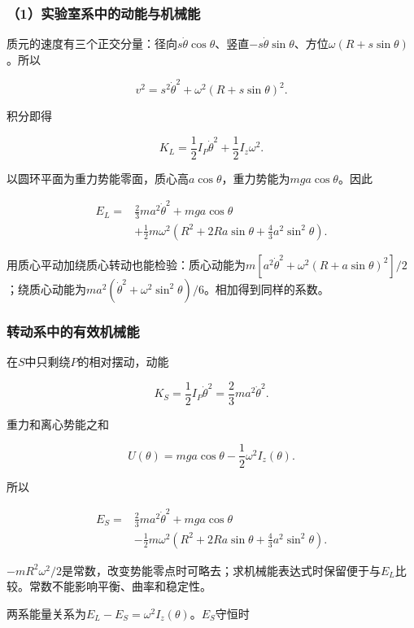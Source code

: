 \documentclass[12pt,a4paper,fontset=fandol]{ctexart}
\begin{document}
\subsubsection{（1）实验室系中的动能与机械能}\label{ux5b9eux9a8cux5ba4ux7cfbux4e2dux7684ux52a8ux80fdux4e0eux673aux68b0ux80fd}

质元的速度有三个正交分量：径向\(s\dot\theta\cos\theta\)、竖直\(-s\dot\theta\sin\theta\)、方位\(\omega(R+s\sin\theta)\)。所以

\[
v^2=s^2\dot\theta^2+\omega^2(R+s\sin\theta)^2.
\]

积分即得

\[
K_L=\frac12I_P\dot\theta^2+\frac12I_z\omega^2.
\]

以圆环平面为重力势能零面，质心高\(a\cos\theta\)，重力势能为\(mga\cos\theta\)。因此

\[
\boxed{
\begin{aligned}
E_L={}&\frac23ma^2\dot\theta^2+mga\cos\theta\\
&+\frac12m\omega^2
\left(R^2+2Ra\sin\theta+\frac43a^2\sin^2\theta\right).
\end{aligned}}
\]

用质心平动加绕质心转动也能检验：质心动能为\(m[a^2\dot\theta^2+\omega^2(R+a\sin\theta)^2]/2\)；绕质心动能为\(ma^2(\dot\theta^2+\omega^2\sin^2\theta)/6\)。相加得到同样的系数。

\subsubsection{转动系中的有效机械能}\label{ux8f6cux52a8ux7cfbux4e2dux7684ux6709ux6548ux673aux68b0ux80fd}

在\(S\)中只剩绕\(P\)的相对摆动，动能

\[
K_S=\frac12I_P\dot\theta^2=\frac23ma^2\dot\theta^2.
\]

重力和离心势能之和

\[
U(\theta)=mga\cos\theta-\frac12\omega^2I_z(\theta).
\]

所以

\[
\boxed{
\begin{aligned}
E_S={}&\frac23ma^2\dot\theta^2+mga\cos\theta\\
&-\frac12m\omega^2
\left(R^2+2Ra\sin\theta+\frac43a^2\sin^2\theta\right).
\end{aligned}}
\]

\(-mR^2\omega^2/2\)是常数，改变势能零点时可略去；求机械能表达式时保留便于与\(E_L\)比较。常数不能影响平衡、曲率和稳定性。

两系能量关系为\(E_L-E_S=\omega^2I_z(\theta)\)。\(E_S\)守恒时
\end{document}
